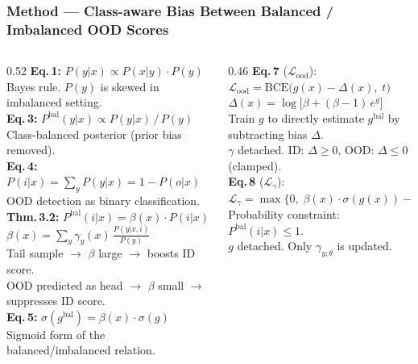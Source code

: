 \documentclass[10pt,aspectratio=169]{beamer}
\begin{document}
\begin{frame}
\frametitle{Method --- Class-aware Bias Between Balanced / Imbalanced OOD Scores}
{\small
\begin{columns}[T]
\begin{column}{0.52\textwidth}
\textbf{Eq.\,1:}\; $P(y|x) \propto P(x|y) \cdot P(y)$\\
{\scriptsize Bayes rule. $P(y)$ is skewed in imbalanced setting.}\\[3pt]

\textbf{Eq.\,3:}\; $P^\text{bal}(y|x) \propto P(y|x)\,/\,P(y)$\\
{\scriptsize Class-balanced posterior (prior bias removed).}\\[3pt]

\textbf{Eq.\,4:}\; $P(i|x) = \textstyle\sum_y P(y|x) = 1 - P(o|x)$\\
{\scriptsize OOD detection as binary classification.}\\[3pt]

\textbf{Thm.\,3.2:}\; $P^\text{bal}(i|x) = \beta(x) \cdot P(i|x)$\\
{\scriptsize $\beta(x) = \textstyle\sum_y \gamma_y(x)\,\frac{P(y|x,i)}{P(y)}$}\\[2pt]
{\scriptsize Tail sample $\rightarrow$ $\beta$ large $\rightarrow$ boosts ID score.}\\
{\scriptsize OOD predicted as head $\rightarrow$ $\beta$ small $\rightarrow$ suppresses ID score.}\\[3pt]

\textbf{Eq.\,5:}\; $\sigma(g^\text{bal}) = \beta(x)\cdot\sigma(g)$\\
{\scriptsize Sigmoid form of the balanced/imbalanced relation.}
\end{column}
\begin{column}{0.46\textwidth}
\textbf{Eq.\,7}\; ($\mathcal{L}_\text{ood}$):\\[2pt]
$\mathcal{L}_\text{ood} = \text{BCE}\!\big(g(x) - \Delta(x),\; t\big)$\\[2pt]
{\scriptsize $\Delta(x) = \log\!\big[\beta + (\beta\!-\!1)\,e^{g}\big]$}\\[2pt]
{\scriptsize Train $g$ to directly estimate $g^\text{bal}$ by subtracting bias $\Delta$.}\\
{\scriptsize $\gamma$ detached.\; ID: $\Delta\!\ge\!0$, \;OOD: $\Delta\!\le\!0$ \;(clamped).}\\[6pt]

\textbf{Eq.\,8}\; ($\mathcal{L}_\gamma$):\\[2pt]
$\mathcal{L}_\gamma = \max\!\big\{0,\;\beta(x)\!\cdot\!\sigma(g(x))-1\big\}$\\[2pt]
{\scriptsize Probability constraint: $P^\text{bal}(i|x)\le 1$.}\\
{\scriptsize $g$ detached.\; Only $\gamma_{y;\theta}$ is updated.}\\[8pt]


\end{column}
\end{columns}}
\end{frame}
\end{document}
